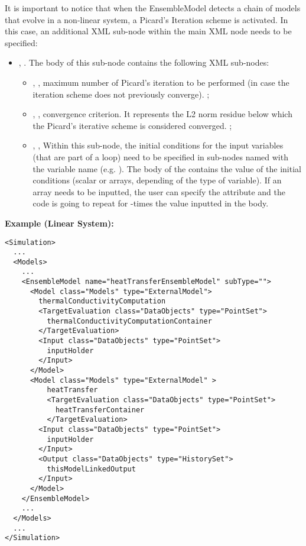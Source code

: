 It is important to notice that when the EnsembleModel detects a chain of models that evolve in a non-linear system, a Picard's Iteration scheme is activated. In this case, an additional XML sub-node within the main  XML node needs to be specified:
\begin{itemize}
  \item {}, .
  The body of this sub-node  contains the following XML sub-nodes:
  \begin{itemize}
     \item {}, ,
        maximum number of Picard's iteration to be performed (in case the iteration scheme does
        not previously converge). ;
     \item {}, ,
        convergence criterion. It represents the L2 norm residue below which the Picard's iterative scheme is
        considered converged. ;
     \item {}, ,
        Within this sub-node, the initial conditions for the input variables (that are part of a loop)  need to
        be specified in sub-nodes named with the variable name (e.g. ). The body of the
         contains the value of the initial conditions (scalar or arrays, depending of the
        type of variable). If an array needs to be inputted, the user can specify the attribute  
        and the code is going to repeat for  -times the value inputted in the body.
    \end{itemize}
\end{itemize}
\textbf{Example (Linear System):}
\begin{lstlisting}[style=XML,morekeywords={subType,debug,name,class,type}]
<Simulation>
  ...
  <Models>
    ...
    <EnsembleModel name="heatTransferEnsembleModel" subType="">
      <Model class="Models" type="ExternalModel">
        thermalConductivityComputation
        <TargetEvaluation class="DataObjects" type="PointSet">
          thermalConductivityComputationContainer
        </TargetEvaluation>
        <Input class="DataObjects" type="PointSet">
          inputHolder
        </Input>
      </Model>
      <Model class="Models" type="ExternalModel" >
          heatTransfer
          <TargetEvaluation class="DataObjects" type="PointSet">
            heatTransferContainer
          </TargetEvaluation>
        <Input class="DataObjects" type="PointSet">
          inputHolder
        </Input>
        <Output class="DataObjects" type="HistorySet">
          thisModelLinkedOutput
        </Input>
      </Model>
    </EnsembleModel>
    ...
  </Models>
  ...
</Simulation>
\end{lstlisting}

